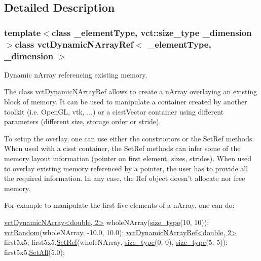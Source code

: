 \subsection{Detailed Description}
\subsubsection*{template$<$class \-\_\-element\-Type, vct\-::size\-\_\-type \-\_\-dimension$>$class vct\-Dynamic\-N\-Array\-Ref$<$ \-\_\-element\-Type, \-\_\-dimension $>$}

Dynamic n\-Array referencing existing memory. 

The class \hyperlink{classvct_dynamic_n_array_ref}{vct\-Dynamic\-N\-Array\-Ref} allows to create a n\-Array overlaying an existing block of memory. It can be used to manipulate a container created by another toolkit (i.\-e. Open\-G\-L, vtk, ...) or a cisst\-Vector container using different parameters (different size, storage order or stride).

To setup the overlay, one can use either the constructors or the Set\-Ref methods. When used with a cisst container, the Set\-Ref methods can infer some of the memory layout information (pointer on first element, sizes, strides). When used to overlay existing memory referenced by a pointer, the user has to provide all the required information. In any case, the Ref object doesn't allocate nor free memory.

For example to manipulate the first five elements of a n\-Array, one can do\-: 
\begin{DoxyCode}
\hyperlink{classvct_dynamic_n_array}{vctDynamicNArray<double, 2>} wholeNArray(\hyperlink{namespacevct_a3e2935e13aac4500965e00d30565775b}{size\_type}(10, 10));
\hyperlink{group__cisst_vector_ga0d25660a2dc6ef9c093f6f6b2804d2d0}{vctRandom}(wholeNArray, -10.0, 10.0);
\hyperlink{classvct_dynamic_n_array_ref}{vctDynamicNArrayRef<double, 2>} first5x5;
first5x5.\hyperlink{classvct_dynamic_n_array_ref_a395385ec68aafaea6e60af8bd330eb82}{SetRef}(wholeNArray, \hyperlink{namespacevct_a3e2935e13aac4500965e00d30565775b}{size\_type}(0, 0), \hyperlink{namespacevct_a3e2935e13aac4500965e00d30565775b}{size\_type}(5, 5));
first5x5.\hyperlink{classvct_dynamic_n_array_base_a4f0285807b627852ebd8ab0ac3ef3fec}{SetAll}(5.0);
\end{DoxyCode}



